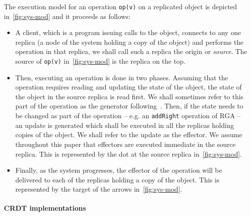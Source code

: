The execution model for an operation \lstinline|op(v)| on a replicated
object is depicted in~\autoref{fig:sys-mod} and it proceeds as follows:
\begin{itemize}
\item A client, which is a program issuing calls to the object, connects
  to any one replica (a node of the system holding a copy of the object)
  and performs the operation in that replica, we shall call such a
  replica the origin or \emph{source}. The source of \lstinline|op(v)|
  in~\autoref{fig:sys-mod} is the replica on the top.
\item Then, executing an operation is done in two phases.
  Assuming that the operation requires reading and updating the state
  of the object, the state of the object in the source replica is read
  first.
  We shall sometimes refer to this part of the operation as the
  generator following~\cite{ShapiroPBZ11}.
  Then, if the state needs to be changed as part of the operation --
  e.g. an \lstinline|addRight| operation of RGA -- an update is
  generated which shall be executed in all the replicas holding copies of the
  object.
  We shall refer to the update as the effector.
  We assume throughout this paper that effectors are executed
  immediate in the source replica.
  This is represented by the dot at the source replica
  in~\autoref{fig:sys-mod}.
\item Finally, as the system progresses, the effector of the operation
  will be delivered to each of the replicas holding a copy of the
  object.
  This is represented by the target of the arrows
  in~\autoref{fig:sys-mod}.
\end{itemize}

\paragraph{CRDT implementations}

